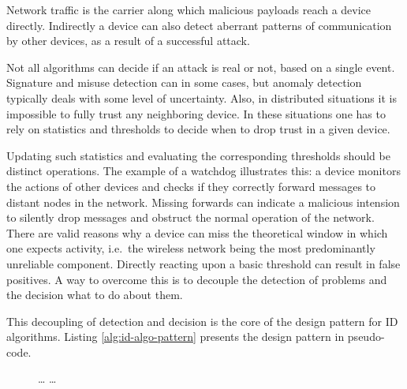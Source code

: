 \documentclass[conference]{IEEEtran}
\begin{document}
Network traffic is the carrier along which malicious payloads reach a device
directly. Indirectly a device can also detect aberrant patterns of
communication by other devices, as a result of a successful attack.

Not all algorithms can decide if an attack is real or not, based on a single
event. Signature and misuse detection can in some cases, but anomaly detection
typically deals with some level of uncertainty. Also, in distributed situations
it is impossible to fully trust any neighboring device. In these situations one
has to rely on statistics and thresholds to decide when to drop trust in a
given device.

Updating such statistics and evaluating the corresponding thresholds should be
distinct operations. The example of a watchdog \cite{mishra2004intrusion}
illustrates this: a device monitors the actions of other devices and checks if
they correctly forward messages to distant nodes in the network. Missing
forwards can indicate a malicious intension to silently drop messages and
obstruct the normal operation of the network. There are valid reasons why a
device can miss the theoretical window in which one expects activity, i.e.\ the
wireless network being the most predominantly unreliable component. Directly
reacting upon a basic threshold can result in false positives. A way to
overcome this is to decouple the detection of problems and the decision what to
do about them.

This decoupling of detection and decision is the core of the design pattern for
ID algorithms. Listing \ref{alg:id-algo-pattern} presents the design pattern in
pseudo-code.

\begin{figure}[ht]
\begin{algorithmic}[1]
     \label{alg:id-algo-pattern-loop1}
     \State \dots {}
    \EndFor
      
    \State {}  \label{alg:id-algo-pattern-send1}
  \EndFunction
  \State
     \label{alg:id-algo-pattern-loop2} \label{alg:id-algo-pattern-common-data}
       
        \State \dots {}
        \State {}  \label{alg:id-algo-pattern-send2}
      \EndIf
    \EndFor
  \EndFunction
  \State
\end{algorithmic}
\end{figure}
\end{document}
